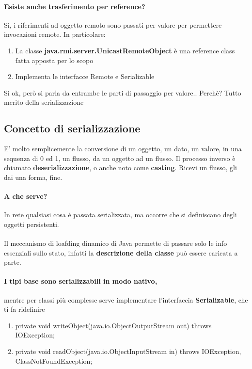 \documentclass[12pt, a4paper, openany, twoside]{book}
\begin{document}
\paragraph{Esiste anche trasferimento per reference?} Sì, i riferimenti ad 
oggetto remoto sono passati per valore per permettere invocazioni remote. 
In particolare:
\begin{enumerate}
	\item La classe \textbf{java.rmi.server.UnicastRemoteObject} è una reference class
	fatta apposta per lo scopo
	\item Implementa le interfacce Remote e Serializable
\end{enumerate}
Sì ok, però si parla da entrambe le parti di passaggio per valore.. Perchè?
Tutto merito della serializzazione
\subsection{Concetto di serializzazione}
E' molto semplicemente la conversione di un oggetto, un dato, un valore, in una
sequenza di 0 ed 1, un flusso, da un oggetto ad un flusso. Il processo inverso
è chiamato \textbf{deserializzazione}, o anche noto come \textbf{casting}. 
Ricevi un flusso, gli dai una forma, fine.
\paragraph{A che serve?} In rete qualsiasi cosa è passata serializzata, ma
occorre che si definiscano degli oggetti persistenti. \\ \\
Il meccanismo di loafding dinamico di Java permette di passare solo le info 
essenziali sullo stato, infatti la \textbf{descrizione della classe} può
essere caricata a parte.
\paragraph{I tipi base sono serializzabili in modo nativo,} mentre per classi 
più complesse serve implementare l'interfaccia \textbf{Serializable}, che ti
fa ridefinire 
\begin{enumerate}
	\item private void writeObject(java.io.ObjectOutputStream out) throws IOException;
	\item private void readObject(java.io.ObjectInputStream in) throws IOException, ClassNotFoundException;
\end{enumerate}
\end{document}
